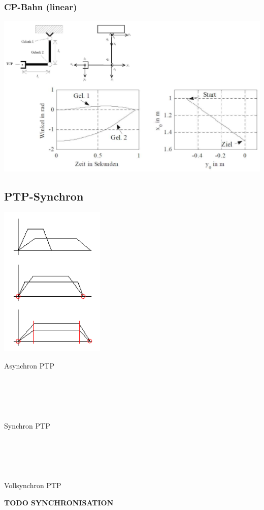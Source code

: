 \begin{multicols}{3}
\begin{minipage}{\linewidth}
        \subsubsection{CP-Bahn (linear)}
        \includegraphics[width=\linewidth]{./bilder/VBCPB}
    \end{minipage}
\end{multicols}

\subsection{PTP-Synchron}
\begin{minipage}{6cm}
    \includegraphics[width=5cm]{./bilder/synchron}
\end{minipage}
\begin{minipage}{12.5cm}
    Asynchron PTP\\ \\ \\ \\ \\ \\
    Synchron PTP\\ \\ \\ \\ \\ \\
    Vollsynchron PTP\\
\end{minipage}
\newline
\textbf{TODO SYNCHRONISATION }
\clearpage
